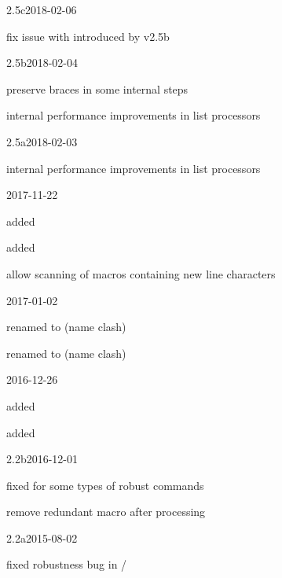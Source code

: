 \begin{changelog}
\begin{release}{2.5c}{2018-02-06}
\item fix issue with  introduced by v2.5b
\end{release}

\begin{release}{2.5b}{2018-02-04}
\item preserve braces in some internal steps
\item internal performance improvements in list processors
\end{release}

\begin{release}{2.5a}{2018-02-03}
\item internal performance improvements in list processors
\end{release}

\begin{release}{2.5}{2017-11-22}
\item added 
\item added 
\item allow scanning of macros containing new line characters
\end{release}

\begin{release}{2.4}{2017-01-02}
\item renamed  to  (name clash)
\item renamed  to  (name clash)
\end{release}

\begin{release}{2.3}{2016-12-26}
\item added 
\item added 
\end{release}

\begin{release}{2.2b}{2016-12-01}
\item fixed  for some types of \latex robust commands
\item remove redundant macro after  processing
\end{release}

\begin{release}{2.2a}{2015-08-02}
\item fixed robustness bug in /
\end{release}


\end{changelog}
